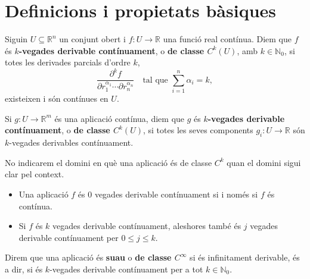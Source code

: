 \newpage
\section{Definicions i propietats bàsiques}
\begin{defi}
    Siguin $U\subseteq\mathbb R^n$ un conjunt obert i $f:U\to\mathbb R$ una funció real contínua.
    Diem que $f$ és \textbf{ $k$-vegades derivable contínuament}, o \textbf{de classe $C^k(U)$}, amb $k\in\mathbb N_0$, si totes les derivades parcials d'ordre $k$, \begin{equation*}
        \frac{\partial^k f}{\partial r_1^{\alpha_1}\cdots\partial r_n^{\alpha_n}}\quad\text{tal que }\sum_{i=1}^n\alpha_i = k,
    \end{equation*} existeixen i són contínues en $U$.

    Si $g:U\to\mathbb R^m$ és una aplicació contínua, diem que $g$ és \textbf{ $k$-vegades derivable contínuament}, o \textbf{de classe $C^k(U)$}, si totes les seves components $g_i:U\to\mathbb R$ són $k$-vegades derivables contínuament.
\end{defi}
\begin{nota}
    No indicarem el domini en què una aplicació és de classe $C^k$ quan el domini sigui clar pel context.
\end{nota}

\begin{obss}
\end{obss}
\begin{itemize}
    \item Una aplicació $f$ és $0$ vegades derivable contínuament si i només si $f$ és contínua. 
    \item Si $f$ és $k$ vegades derivable contínuament, aleshores també és $j$ vegades derivable contínuament per $0\le j\le k$.
\end{itemize}

\begin{defi}
    Direm que una aplicació és \textbf{suau} o \textbf{de classe $C^\infty$} si és infinitament derivable, és a dir, si és $k$-vegades derivable contínuament per a tot $k\in\mathbb N_0$.
\end{defi}

